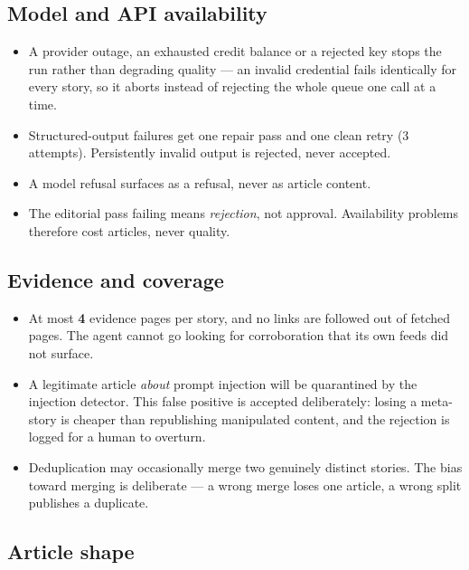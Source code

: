 \documentclass[11pt,a4paper]{article}
\begin{document}
\subsection{Model and API availability}

\begin{itemize}[leftmargin=1.2em,itemsep=0.25em]
  \item A provider outage, an exhausted credit balance or a rejected key stops the
    run rather than degrading quality --- an invalid credential fails identically for
    every story, so it aborts instead of rejecting the whole queue one call at a
    time.
  \item Structured-output failures get one repair pass and one clean retry
    (3 attempts). Persistently invalid output is rejected, never accepted.
  \item A model refusal surfaces as a refusal, never as article content.
  \item The editorial pass failing means \emph{rejection}, not approval.
    Availability problems therefore cost articles, never quality.
\end{itemize}

\subsection{Evidence and coverage}

\begin{itemize}[leftmargin=1.2em,itemsep=0.25em]
  \item At most \textbf{4} evidence pages per story, and no links are followed out
    of fetched pages. The agent cannot go looking for corroboration that its own
    feeds did not surface.
  \item A legitimate article \emph{about} prompt injection will be quarantined by
    the injection detector. This false positive is accepted deliberately: losing a
    meta-story is cheaper than republishing manipulated content, and the rejection
    is logged for a human to overturn.
  \item Deduplication may occasionally merge two genuinely distinct stories. The
    bias toward merging is deliberate --- a wrong merge loses one article, a wrong
    split publishes a duplicate.
\end{itemize}

\subsection{Article shape}
\end{document}
